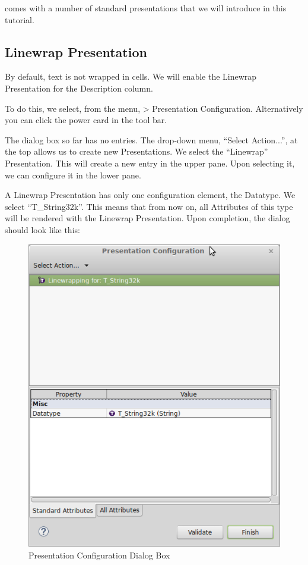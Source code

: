 \pror{} comes with a number of standard presentations that we will introduce in this tutorial.

\subsection{Linewrap Presentation}

By default, text is not wrapped in cells.  We will enable the Linewrap Presentation for the Description column.

To do this, we select, from the menu,  \pror{} \textgreater{} Presentation Configuration.  Alternatively you can click the power card in the tool bar.

The dialog box so far has no entries.  The drop-down menu, ``Select Action...'', at the top allows us to create new Presentations.  We select the ``Linewrap'' Presentation.  This will create a new entry in the upper pane.  Upon selecting it, we can configure it in the lower pane.

A Linewrap Presentation has only one configuration element, the Datatype.  We select ``T\_String32k''.  This means that from now on, all Attributes of this type will be rendered with the Linewrap Presentation.  Upon completion, the dialog should look like this:

\begin{figure}[h!]
\centering
\includegraphics[width=0.8\linewidth]{../rmf-images/presentationconfig.png}      
\caption{Presentation Configuration Dialog Box}      
\label{fig:presentationConfig}
\end{figure}


